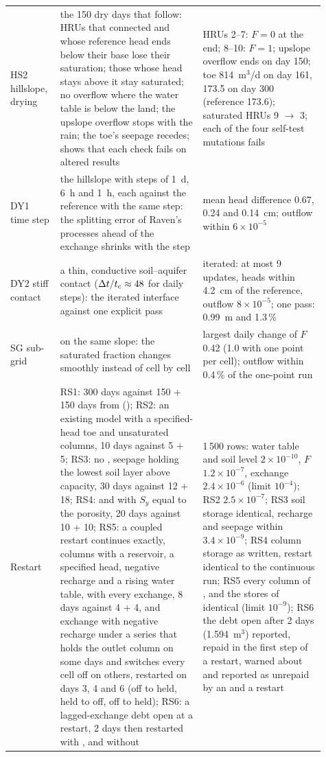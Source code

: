 \begin{longtable}{P{0.13\linewidth}P{0.42\linewidth}P{0.36\linewidth}}
HS2 hillslope, drying & the 150 dry days that follow: HRUs that connected and whose reference head ends below their base lose their saturation; those whose head stays above it stay saturated; no overflow where the water table is below the land; the upslope overflow stops with the rain; the toe's seepage recedes;  shows that each check fails on altered results & HRUs 2--7: $F=0$ at the end; 8--10: $F=1$; upslope overflow ends on day 150; toe 814~m$^3$/d on day 161, 173.5 on day 300 (reference 173.6); saturated HRUs 9 $\to$ 3; each of the four self-test mutations fails\\
DY1 time step & the hillslope with steps of 1~d, 6~h and 1~h, each against the reference with the same step: the splitting error of Raven's processes ahead of the exchange shrinks with the step & mean head difference 0.67, 0.24 and 0.14~cm; outflow within $6\times10^{-5}$\\
DY2 stiff contact & a thin, conductive soil--aquifer contact ($\Delta t/t_c\approx48$ for daily steps): the iterated interface against one explicit pass & iterated: at most 9 updates, heads within 4.2~cm of the reference, outflow $8\times10^{-5}$; one pass: 0.99~m and 1.3\,\%\\
SG sub-grid &  on the same slope: the saturated fraction changes smoothly instead of cell by cell & largest daily change of $F$ 0.42 (1.0 with one point per cell); outflow within 0.4\,\% of the one-point run\\
Restart & RS1: 300 days against 150 + 150 days from  (); RS2: an existing model with a specified-head toe and unsaturated columns, 10 days against 5 + 5; RS3: no , seepage holding the lowest soil layer above capacity, 30 days against 12 + 18; RS4:  and  with $S_y$ equal to the porosity, 20 days against 10 + 10; RS5: a coupled restart continues exactly,  columns with a reservoir, a specified head, negative recharge and a rising water table,  with every exchange, 8 days against 4 + 4, and  exchange with negative recharge under a  series that holds the outlet column on some days and switches every cell off on others, restarted on days 3, 4 and 6 (off to held, held to off, off to held); RS6: a lagged-exchange debt open at a restart, 2 days then restarted with ,  and without  & 1\,500 rows: water table and soil level $2\times10^{-10}$, $F$ $1.2\times10^{-7}$, exchange $2.4\times10^{-6}$ (limit $10^{-4}$); RS2 $2.5\times10^{-7}$; RS3 soil storage identical, recharge and seepage within $3.4\times10^{-9}$; RS4 column storage as written, restart identical to the continuous run; RS5 every column of ,  and the stores of  identical (limit $10^{-9}$); RS6 the debt open after 2 days (1.594~m$^3$) reported, repaid in the first step of a  restart, warned about and reported as unrepaid by an  and a  restart\\

\end{longtable}
